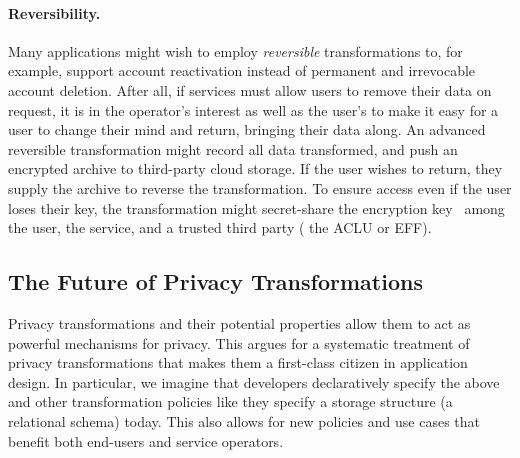 \paragraph{Reversibility.}
%
Many applications might wish to employ \emph{reversible} transformations to, for example, support
account reactivation instead of permanent and irrevocable account deletion.
%
After all, if services must allow users to remove their data on request, it is in the operator's
interest as well as the user's to make it easy for a user to change their mind and return, bringing their data along.
%
An advanced reversible transformation might record all data transformed, and push an encrypted
archive to third-party cloud storage.
%
If the user wishes to return, they supply the archive to reverse the transformation.
%
To ensure access even if the user loses their key, the transformation might secret-share
the encryption key~\cite{secretsharing} among the user, the service, and a trusted third party (\eg
the ACLU or EFF).
%

\subsection{The Future of Privacy Transformations}
%
%
Privacy transformations and their potential properties allow them to act as powerful mechanisms for
privacy. This argues for a systematic treatment of privacy transformations that makes them a
first-class citizen in application design.
%
In particular, we imagine that developers declaratively specify the above and other
transformation policies like they specify a storage structure (\eg a relational schema) today.
%
This also allows for new policies and use cases that benefit both end-users and service operators.
%
%
